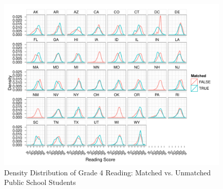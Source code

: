 \documentclass[letterpaper,12p,twoside]{article} %
\begin{document}
\begin{figure}[h]
\begin{center}
\includegraphics[height=\textwidth,angle=90]{../Figures/g4readinglrPublicDensity.pdf}
\caption{Density Distribution of Grade 4 Reading: Matched vs. Unmatched Public School Students}
\label{fig:g4reading:publicdensity}
\end{center}
\end{figure}
\clearpage
\end{document}
